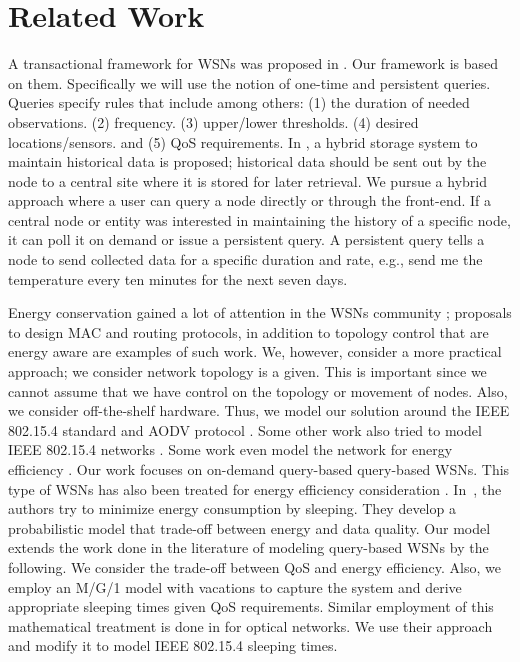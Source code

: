 \section{Related Work} \label{sec:relwork}

A transactional framework for WSNs was proposed in \cite{2, 24}. Our framework is based on them. Specifically we will use the notion of one-time and persistent queries. Queries specify rules that include among others: (1) the duration of needed observations. (2) frequency. (3) upper/lower thresholds. (4) desired locations/sensors. and (5) QoS requirements. In \cite{2}, a hybrid storage system to maintain historical data is proposed; historical data should be sent out by the node to a central site where it is stored for later retrieval. We pursue a hybrid approach where a user can query a node directly or through the front-end. If a central node or entity was interested in maintaining the history of a specific node, it can poll it on demand or issue a persistent query. A persistent query tells a node to send collected data for a specific duration and rate, e.g., send me the temperature every ten minutes for the next seven days.

Energy conservation gained a lot of attention in the WSNs community \cite{1,5,6,7}; proposals to design MAC and routing protocols, in addition to topology control that are energy aware are examples of such work. We, however, consider a more practical approach; we consider network topology is a given. This is important since we cannot assume that we have control on the topology or movement of nodes. Also, we consider off-the-shelf hardware. Thus, we model our solution around the IEEE 802.15.4 standard and AODV protocol \cite{aodv}. Some other work also tried to model IEEE 802.15.4 networks \cite{8,9,10,4.11,12,13}. Some work even model the network for energy efficiency \cite{10,12,13}. Our work focuses on on-demand query-based query-based WSNs. This type of WSNs has also been treated for energy efficiency consideration \cite{14,25}. In~\cite{25}, the authors try to minimize energy consumption by sleeping. They develop a probabilistic model that trade-off between energy and data quality. Our model extends the work done in the literature of modeling query-based WSNs by the following. We consider the trade-off between QoS and energy efficiency. Also, we employ an M/G/1 model with vacations to capture the system and derive appropriate sleeping times given QoS requirements. Similar employment of this mathematical treatment is done in \cite{15} for optical networks. We use their approach and modify it to model IEEE 802.15.4 sleeping times.

